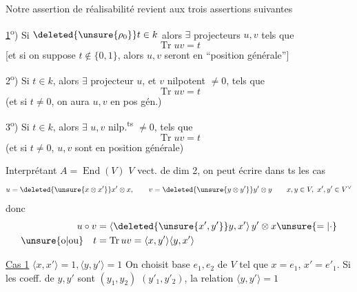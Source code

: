 Notre assertion de réalisabilité  revient aux trois assertions suivantes

\uline{1}\textsuperscript{o}) Si $\deleted{\unsure{\rho_0}}t\in k$  alors $\exists$ projecteurs $u,v$   tels que
\[
\operatorname{Tr}uv=t
\]
[et si on suppose $t\notin\{0,1\}$, alors $u,v$ seront en ``position générale'']

2\textsuperscript{o}) Si $t\in k$, alors $\exists$ projecteur  $u$, et $v$ nilpotent $\ne0$,  tels que
\[
\operatorname{Tr}uv=t
\]
(et si $t\ne0$, on aura $u,v$ en pos gén.)

3\textsuperscript{o}) Si $t\in k$, alors $\exists$ $u,v$ nilp.\textsuperscript{ts} $\ne0$, tels que
\[
\operatorname{Tr}uv=t
\]
(et si $t\ne0$, $u,v$ sont en position générale)

Interprétant $A=\operatorname{End}(V)$ $V$ vect. de dim 2, on peut écrire dans ts les cas
\[
u=\deleted{\unsure{x\otimes x'}}x'\otimes x,\qquad v=\deleted{\unsure{y\otimes y'}}y'\otimes y\qquad x,y\in V,\ x',y'\in V^\vee
\]
donc
\[
\begin{aligned}
u\circ v&=\langle\deleted{\unsure{x',y'}}y,x'\rangle\, y'\otimes x\unsure{=|\cdot}\\ \unsure{\text{o}|\text{ou}}\quad t&=\operatorname{Tr}uv=\langle x,y'\rangle\langle y,x'\rangle
\end{aligned}
\]

\uline{Cas 1}  $\langle x,x'\rangle=1,\langle y,y'\rangle=1$ On choisit base $e_1,e_2$ de $V$ tel que $x=e_1$, $x'=e'_1$. Si les coeff. de $y,y'$ sont $(y_1,y_2)$ $(y'_1,y'_2)$, la relation $\langle y,y'\rangle=1$
